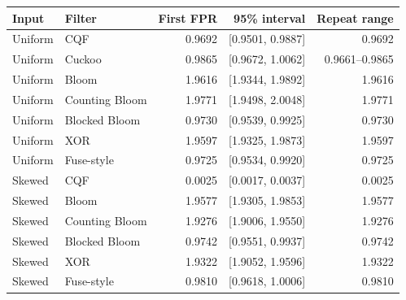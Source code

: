 \begin{tabular}{@{}llrrr@{}}
\toprule
\textbf{Input} & \textbf{Filter} & \textbf{First FPR} & \textbf{95\% interval} & \textbf{Repeat range} \\
\midrule
Uniform & CQF & 0.9692 & [0.9501, 0.9887] & 0.9692 \\
Uniform & Cuckoo & 0.9865 & [0.9672, 1.0062] & 0.9661--0.9865 \\
Uniform & Bloom & 1.9616 & [1.9344, 1.9892] & 1.9616 \\
Uniform & Counting Bloom & 1.9771 & [1.9498, 2.0048] & 1.9771 \\
Uniform & Blocked Bloom & 0.9730 & [0.9539, 0.9925] & 0.9730 \\
Uniform & XOR & 1.9597 & [1.9325, 1.9873] & 1.9597 \\
Uniform & Fuse-style & 0.9725 & [0.9534, 0.9920] & 0.9725 \\
Skewed & CQF & 0.0025 & [0.0017, 0.0037] & 0.0025 \\
Skewed & Bloom & 1.9577 & [1.9305, 1.9853] & 1.9577 \\
Skewed & Counting Bloom & 1.9276 & [1.9006, 1.9550] & 1.9276 \\
Skewed & Blocked Bloom & 0.9742 & [0.9551, 0.9937] & 0.9742 \\
Skewed & XOR & 1.9322 & [1.9052, 1.9596] & 1.9322 \\
Skewed & Fuse-style & 0.9810 & [0.9618, 1.0006] & 0.9810 \\
\bottomrule
\end{tabular}
